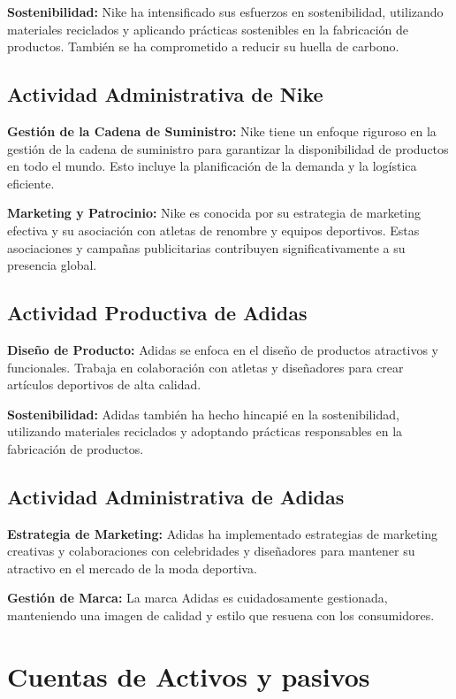 \documentclass[a4paper,12pt]{article}
\begin{document}
\textbf{Sostenibilidad:} Nike ha intensificado sus esfuerzos en sostenibilidad, utilizando materiales reciclados y aplicando prácticas sostenibles en la fabricación de productos. También se ha comprometido a reducir su huella de carbono.

\subsection{Actividad Administrativa de Nike}

\textbf{Gestión de la Cadena de Suministro:} Nike tiene un enfoque riguroso en la gestión de la cadena de suministro para garantizar la disponibilidad de productos en todo el mundo. Esto incluye la planificación de la demanda y la logística eficiente.

\textbf{Marketing y Patrocinio:} Nike es conocida por su estrategia de marketing efectiva y su asociación con atletas de renombre y equipos deportivos. Estas asociaciones y campañas publicitarias contribuyen significativamente a su presencia global.

\subsection{Actividad Productiva de Adidas}

\textbf{Diseño de Producto:} Adidas se enfoca en el diseño de productos atractivos y funcionales. Trabaja en colaboración con atletas y diseñadores para crear artículos deportivos de alta calidad.

\textbf{Sostenibilidad:} Adidas también ha hecho hincapié en la sostenibilidad, utilizando materiales reciclados y adoptando prácticas responsables en la fabricación de productos.

\subsection{Actividad Administrativa de Adidas}

\textbf{Estrategia de Marketing:} Adidas ha implementado estrategias de marketing creativas y colaboraciones con celebridades y diseñadores para mantener su atractivo en el mercado de la moda deportiva.

\textbf{Gestión de Marca:} La marca Adidas es cuidadosamente gestionada, manteniendo una imagen de calidad y estilo que resuena con los consumidores.



\clearpage

\section{Cuentas de Activos y pasivos}
\end{document}
